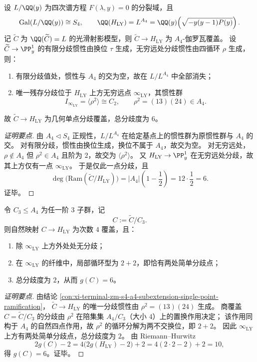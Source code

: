 \begin{conclusion}[\(A_4\)-子扩张中的单点分歧机制]\label{con:xi-terminal-zm-s4-a4-subextension-single-point-ramification}
设 \(L/\QQ(y)\) 为四次谱方程 \(F(\lambda,y)=0\) 的分裂域，且
\[
\mathrm{Gal}(L/\QQ(y))\cong S_4,\qquad
\QQ(H_{\mathrm{LY}})=L^{A_4}
=\QQ(y)\!\left(\sqrt{-y(y-1)P(y)}\right).
\]
记 \(\widetilde{C}\) 为 \(\QQ(\widetilde{C})=L\) 的光滑射影模型，则 \(\widetilde{C}\to H_{\mathrm{LY}}\) 为 \(A_4\)-伽罗瓦覆盖。
设 \(\widetilde{C}\to\PP^1_y\) 的有限分歧惯性由换位 \(\tau\) 生成，无穷远处分歧惯性由四循环 \(\rho\) 生成，则：
\begin{enumerate}
  \item 有限分歧值处，惯性与 \(A_4\) 的交为空，故在 \(L/L^{A_4}\) 中全部消失；
  \item 唯一残存分歧位于 \(H_{\mathrm{LY}}\) 上方无穷远点 \(\infty_{\mathrm{LY}}\)，其惯性群
  \[
  I_{\infty_{\mathrm{LY}}}
  =\langle \rho^2\rangle
  \cong C_2,
  \qquad \rho^2=(13)(24)\in A_4.
  \]
\end{enumerate}
故 \(\widetilde{C}\to H_{\mathrm{LY}}\) 为几何单点分歧覆盖，总分歧度为 \(6\)。
\end{conclusion}
\begin{proof}[证明要点]
由 \(A_4\triangleleft S_4\) 正规性，\(L/L^{A_4}\) 在给定基点上的惯性群为原惯性群与 \(A_4\) 的交。
对有限分歧，惯性由换位生成，换位不属于 \(A_4\)，故交为空。
对无穷远处，\(\rho\notin A_4\) 但 \(\rho^2\in A_4\) 且阶为 \(2\)，故交为 \(\langle\rho^2\rangle\)。
又 \(H_{\mathrm{LY}}\to\PP^1_y\) 在无穷远处分歧，故其上方仅有一点 \(\infty_{\mathrm{LY}}\)。
于是仅此一点分歧，且
\[
\deg\!\bigl(\mathrm{Ram}(\widetilde{C}/H_{\mathrm{LY}})\bigr)
=|A_4|\!\left(1-\frac12\right)
=12\cdot\frac12
=6.
\]
证毕。
\end{proof}

\begin{conclusion}[次数 \(4\) 非伽罗瓦覆盖的极小分歧型]\label{con:xi-terminal-zm-c3-quotient-to-hly-minimal-ramification-type}
令 \(C_3\le A_4\) 为任一阶 \(3\) 子群，记
\[
C:=\widetilde{C}/C_3.
\]
则自然映射 \(C\to H_{\mathrm{LY}}\) 为次数 \(4\) 覆盖，且：
\begin{enumerate}
  \item 除 \(\infty_{\mathrm{LY}}\) 上方外处处无分歧；
  \item 在 \(\infty_{\mathrm{LY}}\) 的纤维中，局部循环型为 \(2+2\)，即恰有两处简单分歧点；
  \item 总分歧度为 \(2\)，从而 \(g(C)=6\)。
\end{enumerate}
\end{conclusion}
\begin{proof}[证明要点]
由结论 \ref{con:xi-terminal-zm-s4-a4-subextension-single-point-ramification}，
\(\widetilde{C}\to H_{\mathrm{LY}}\) 的唯一分歧惯性由 \(\rho^2=(13)(24)\) 生成。
商覆盖 \(C=\widetilde{C}/C_3\) 的分歧由 \(\rho^2\) 在陪集集 \(A_4/C_3\)（大小 \(4\)）上的置换作用决定；
该作用同构于 \(A_4\) 的自然四点作用，故 \(\rho^2\) 的循环分解为两不交换位，即 \(2+2\)。
因此 \(\infty_{\mathrm{LY}}\) 上方有两处简单分歧点，总分歧度为 \(2\)。
由 Riemann--Hurwitz
\[
2g(C)-2
=4\bigl(2g(H_{\mathrm{LY}})-2\bigr)+2
=4(2\cdot2-2)+2
=10,
\]
得 \(g(C)=6\)。证毕。
\end{proof}

